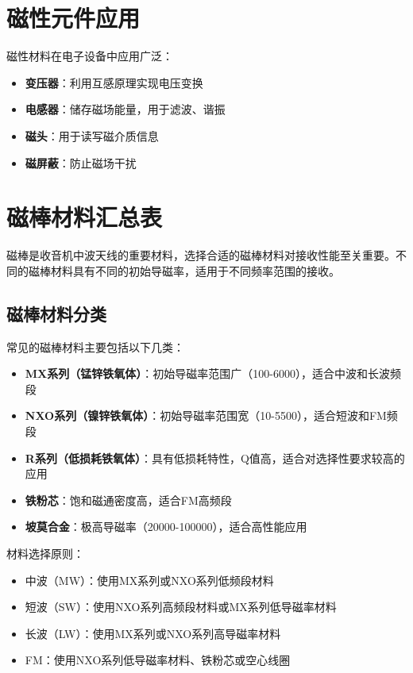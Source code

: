 \section{磁性元件应用}
\label{sec:magnetic_component_applications}

磁性材料在电子设备中应用广泛：

\begin{itemize}
    \item \textbf{变压器}：利用互感原理实现电压变换
    \item \textbf{电感器}：储存磁场能量，用于滤波、谐振
    \item \textbf{磁头}：用于读写磁介质信息
    \item \textbf{磁屏蔽}：防止磁场干扰
\end{itemize}

\section{磁棒材料汇总表}
\label{sec:magnetic_rod_materials}

磁棒是收音机中波天线的重要材料，选择合适的磁棒材料对接收性能至关重要。不同的磁棒材料具有不同的初始导磁率，适用于不同频率范围的接收。

\subsection{磁棒材料分类}
\label{sec:magnetic_materials_classification}

常见的磁棒材料主要包括以下几类：

\begin{itemize}
    \item \textbf{MX系列（锰锌铁氧体）}：初始导磁率范围广（100-6000），适合中波和长波频段
    \item \textbf{NXO系列（镍锌铁氧体）}：初始导磁率范围宽（10-5500），适合短波和FM频段
    \item \textbf{R系列（低损耗铁氧体）}：具有低损耗特性，Q值高，适合对选择性要求较高的应用
    \item \textbf{铁粉芯}：饱和磁通密度高，适合FM高频段
    \item \textbf{坡莫合金}：极高导磁率（20000-100000），适合高性能应用
\end{itemize}

材料选择原则：
\begin{itemize}
    \item 中波（MW）：使用MX系列或NXO系列低频段材料
    \item 短波（SW）：使用NXO系列高频段材料或MX系列低导磁率材料
    \item 长波（LW）：使用MX系列或NXO系列高导磁率材料
    \item FM：使用NXO系列低导磁率材料、铁粉芯或空心线圈
\end{itemize}

